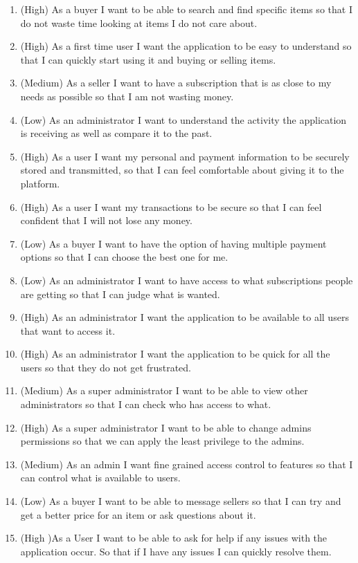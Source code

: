 \documentclass[]{project_report}
\begin{document}
\begin{enumerate}
    \item (High) As a buyer I want to be able to search and find specific items so that I do not waste time looking at items I do not care about.
    \item (High) As a first time user I want the application to be easy to understand so that I can quickly start using it and buying or selling items.
    \item (Medium) As a seller I want to have a subscription that is as close to my needs as possible so that I am not wasting money.
    \item (Low) As an administrator I want to understand the activity the application is receiving as well as compare it to the past.
    \item (High) As a user I want my personal and payment information to be securely stored and transmitted, so that I can feel comfortable about giving it to the platform.
    \item (High) As a user I want my transactions to be secure so that I can feel confident that I will not lose any money.
    \item (Low) As a buyer I want to have the option of having multiple payment options so that I can choose the best one for me.
    \item (Low) As an administrator I want to have access to what subscriptions people are getting so that I can judge what is wanted.
    \item (High) As an administrator I want the application to be available to all users that want to access it.
    \item (High) As an administrator I want the application to be quick for all the users so that they do not get frustrated. 
    \item (Medium) As a super administrator I want to be able to view other administrators so that I can check who has access to what.
    \item (High) As a super administrator I want to be able to change admins permissions so that we can apply the least privilege to the admins.
    \item (Medium) As an admin I want fine grained access control to features so that I can control what is available to users.
    \item (Low) As a buyer I want to be able to message sellers so that I can try and get a better price for an item or ask questions about it.
    \item (High )As a User I want to be able to ask for help if any issues with the application occur. So that if I have any issues I can quickly resolve them.

\end{enumerate}
\end{document}
